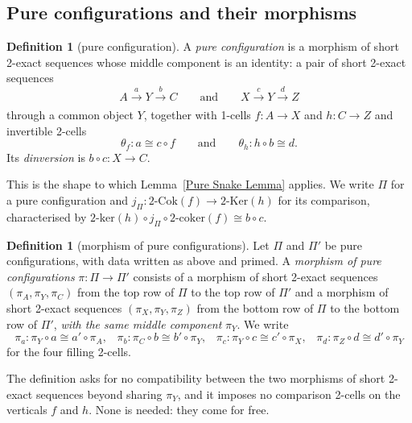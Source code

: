 \documentclass[reqno,a4paper]{amsart}
\numberwithin{equation}{section}
\theoremstyle{plain}
\theoremstyle{definition}
\newtheorem{definition}[subsection]{Definition}
\def\nameit#1{\textrm{#1}~}
\def\lemx{\nameit{Lemma}}
\def\dfn#1{{\itshape #1}}
\newcommand{\comp}{\circ}
\newcommand{\iso}{\cong}
\renewcommand{\1}{\onecat{1}}
\newcommand{\TwoKer}{\ensuremath{2\text{-}\mathrm{Ker}}}
\newcommand{\TwoCoker}{\ensuremath{2\text{-}\mathrm{Cok}}}
\newcommand{\twoker}{\ensuremath{2\text{-}\mathrm{ker}}}
\newcommand{\twocoker}{\ensuremath{2\text{-}\mathrm{coker}}}
\newcommand{\aar}[2][]{\xrightarrow[#1]{#2}}
\begin{document}
\subsection{Pure configurations and their morphisms}\label{SS:PureConfigurations}

\begin{definition}[pure configuration]\label{Def:PureConfiguration}
	A \dfn{pure configuration} is a morphism of short 2-exact sequences whose middle component is an identity: a pair of short 2-exact sequences
	\[
		A\aar{a}Y\aar{b}C
		\qquad\text{and}\qquad
		X\aar{c}Y\aar{d}Z
	\]
	through a common object \(Y\), together with 1-cells \(f\colon A\to X\) and \(h\colon C\to Z\) and invertible 2-cells
	\[
		\theta_f\colon a\iso c\comp f
		\qquad\text{and}\qquad
		\theta_h\colon h\comp b\iso d\text{.}
	\]
	Its \dfn{dinversion} is \(b\comp c\colon X\to C\).
\end{definition}

This is the shape to which \lemx\ref{Pure Snake Lemma} applies. We write \(\Pi\) for a pure configuration and \(j_\Pi\colon\TwoCoker(f)\to\TwoKer(h)\) for its comparison, characterised by \(\twoker(h)\comp j_\Pi\comp\twocoker(f)\iso b\comp c\).

\begin{definition}[morphism of pure configurations]\label{Def:MorphismPure}
	Let \(\Pi\) and \(\Pi'\) be pure configurations, with data written as above and primed. A \dfn{morphism of pure configurations} \(\pi\colon\Pi\to\Pi'\) consists of a morphism of short 2-exact sequences \((\pi_A,\pi_Y,\pi_C)\) from the top row of \(\Pi\) to the top row of \(\Pi'\) and a morphism of short 2-exact sequences \((\pi_X,\pi_Y,\pi_Z)\) from the bottom row of \(\Pi\) to the bottom row of \(\Pi'\), \emph{with the same middle component} \(\pi_Y\). We write
	\[
		\pi_a\colon\pi_Y\comp a\iso a'\comp\pi_A\text{,}\quad
		\pi_b\colon\pi_C\comp b\iso b'\comp\pi_Y\text{,}\quad
		\pi_c\colon\pi_Y\comp c\iso c'\comp\pi_X\text{,}\quad
		\pi_d\colon\pi_Z\comp d\iso d'\comp\pi_Y
	\]
	for the four filling 2-cells.
\end{definition}

The definition asks for no compatibility between the two morphisms of short 2-exact sequences beyond sharing \(\pi_Y\), and it imposes no comparison 2-cells on the verticals \(f\) and \(h\). None is needed: they come for free.
\end{document}
